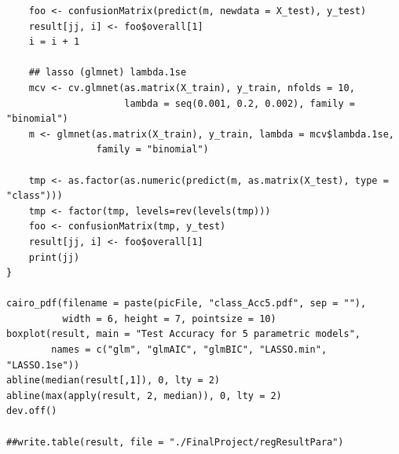 \documentclass[11pt,oneside,a4paper]{article}
\begin{document}
\begin{verbatim}
    foo <- confusionMatrix(predict(m, newdata = X_test), y_test)
    result[jj, i] <- foo$overall[1]
    i = i + 1
    
    ## lasso (glmnet) lambda.1se
    mcv <- cv.glmnet(as.matrix(X_train), y_train, nfolds = 10, 
                     lambda = seq(0.001, 0.2, 0.002), family = "binomial")
    m <- glmnet(as.matrix(X_train), y_train, lambda = mcv$lambda.1se, 
                family = "binomial")
    
    tmp <- as.factor(as.numeric(predict(m, as.matrix(X_test), type = "class")))
    tmp <- factor(tmp, levels=rev(levels(tmp)))
    foo <- confusionMatrix(tmp, y_test)
    result[jj, i] <- foo$overall[1]
    print(jj)
}

cairo_pdf(filename = paste(picFile, "class_Acc5.pdf", sep = ""), 
          width = 6, height = 7, pointsize = 10)
boxplot(result, main = "Test Accuracy for 5 parametric models",
        names = c("glm", "glmAIC", "glmBIC", "LASSO.min", "LASSO.1se"))
abline(median(result[,1]), 0, lty = 2)
abline(max(apply(result, 2, median)), 0, lty = 2)
dev.off()

##write.table(result, file = "./FinalProject/regResultPara")
\end{verbatim}
\end{document}
